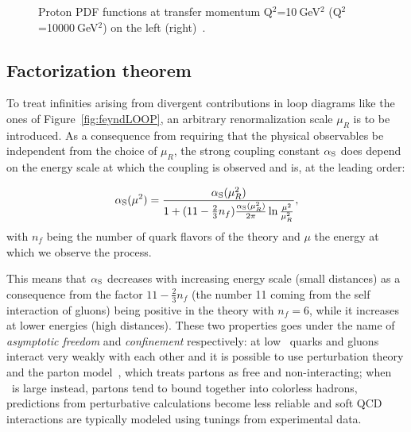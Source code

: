 \begin{figure}[tbph]
\begin{center}
\caption{Proton PDF functions at transfer momentum
 Q$^2$=10$~$GeV$^2$ (Q$^2$=10000$~$GeV$^2$) on the left (right)~\cite{Martin:2009iq}.\label{fig:PDFs}}
\end{center}
\end{figure}



\subsection{Factorization theorem}\label{sec:factorization}

To treat infinities arising from divergent contributions in loop diagrams like
the ones of Figure~\ref{fig:feyndLOOP},
an arbitrary renormalization scale $\mu_R$ is to be introduced. As a consequence
from requiring that the physical observables be independent from the choice of $\mu_R$,
the strong coupling constant $\alphas$ does depend on the energy scale at which the 
coupling is observed and is, at the leading order:

\begin{equation}\label{eq:alphas}
\alphas(\mu^2) = \dfrac{\alphas(\mu_R^2)}{1 + (11 - \frac{2}{3}n_f)\frac{\alphas(\mu_R^2)}{2\pi}\ln\frac{\mu^2}{\mu_R^2} }, 
\end{equation}
with $n_f$ being the number of quark flavors of the theory and $\mu$ the energy at which we observe the process.

This means that $\alphas$ decreases with increasing energy scale (small distances)
as a consequence from the factor $11 - \frac{2}{3}n_f$ (the number 11 coming from the self interaction of gluons)
being positive in the theory with $n_f = 6$,
while it increases at lower energies (high distances). These two properties goes under the name of
{\it asymptotic freedom} and {\it confinement} respectively: at low \alphas\ quarks and gluons interact very weakly with 
each other and it is possible to use perturbation theory and the parton model~\cite{Feynman:1969ej}, 
which treats partons as free and non-interacting; when \alphas\ is large instead, partons tend to bound together
into colorless hadrons, predictions from perturbative calculations become less reliable and soft QCD interactions
are typically modeled using tunings from experimental data.

